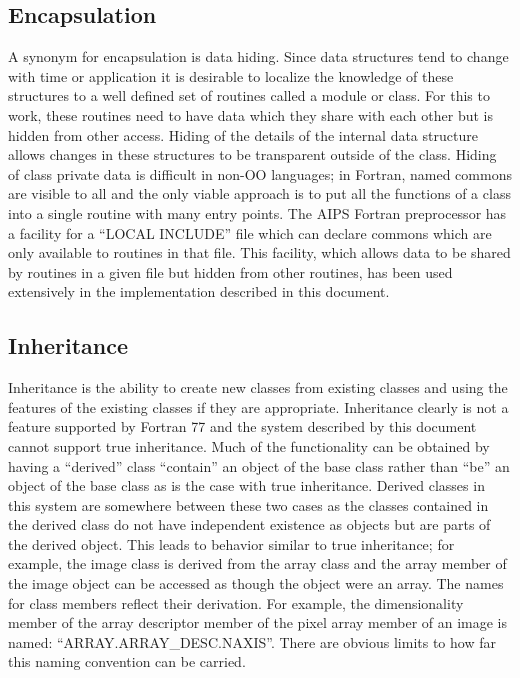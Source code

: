 \subsection{Encapsulation}
   A synonym for encapsulation is data hiding.  Since data structures
tend to change with time or application it is desirable to localize
the knowledge of these structures to a well defined set of routines
called a module or class.  For this to work, these routines need to
have data which they share with each other but is hidden from other
access.  Hiding of the details of the internal data structure allows
changes in these structures to be transparent outside of the class.
   Hiding of class private data is difficult in non-OO languages;
in Fortran, named commons are visible to all and the only viable
approach is to put all the functions of a class into a single routine
with many entry points.  The AIPS Fortran preprocessor has a facility
for a ``LOCAL INCLUDE'' file which can declare commons which are only
available to routines in that file.  This facility, which allows data
to be shared by routines in a given file but hidden from other
routines, has been used extensively in the implementation described in
this document.

\subsection{Inheritance}
   Inheritance is the ability to create new classes from existing
classes and using the features of the existing classes if they are
appropriate.  Inheritance clearly is not a feature supported by
Fortran 77 and the system described by this document cannot support
true inheritance.  Much of the functionality can be obtained by having
a ``derived'' class ``contain'' an object of the base class rather
than ``be'' an object of the base class as is the case with true
inheritance.  Derived classes in this system are somewhere between
these two cases as the classes contained in the derived class do not
have independent existence as objects but are parts of the derived
object.  This leads to behavior similar to true inheritance; for
example, the image class is derived from the array class and the array
member of the image object can be accessed as though the object were
an array. The names for class members reflect their derivation.  For
example, the dimensionality member of the array descriptor member of
the pixel array member of an image is named:
``ARRAY.ARRAY\_DESC.NAXIS''.  There are obvious limits to how far this
naming convention can be carried.

